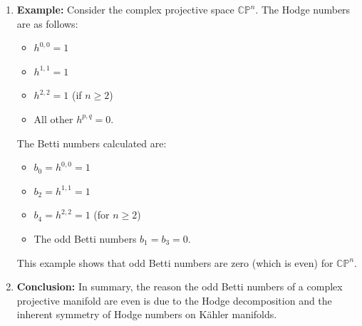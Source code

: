 \documentclass[lang=en,12pt,twoside]{textbook}
\begin{document}
\begin{enumerate}
\item \textbf{Example:}
Consider the complex projective space $\mathbb{CP}^n$. The Hodge numbers are as follows:
\begin{itemize}
    \item $h^{0,0} = 1$
    \item $h^{1,1} = 1$
    \item $h^{2,2} = 1$ (if $n \geq 2$)
    \item All other $h^{p,q} = 0$.
\end{itemize}

The Betti numbers calculated are:
\begin{itemize}
    \item $b_0 = h^{0,0} = 1$
    \item $b_2 = h^{1,1} = 1$
    \item $b_4 = h^{2,2} = 1$ (for $n \geq 2$)
    \item The odd Betti numbers $b_1 = b_3 = 0$.
\end{itemize}

This example shows that odd Betti numbers are zero (which is even) for $\mathbb{CP}^n$.

\item \textbf{Conclusion:}
In summary, the reason the odd Betti numbers of a complex projective manifold are even is due to the Hodge decomposition and the inherent symmetry of Hodge numbers on Kähler manifolds.
\end{enumerate}
\end{document}
